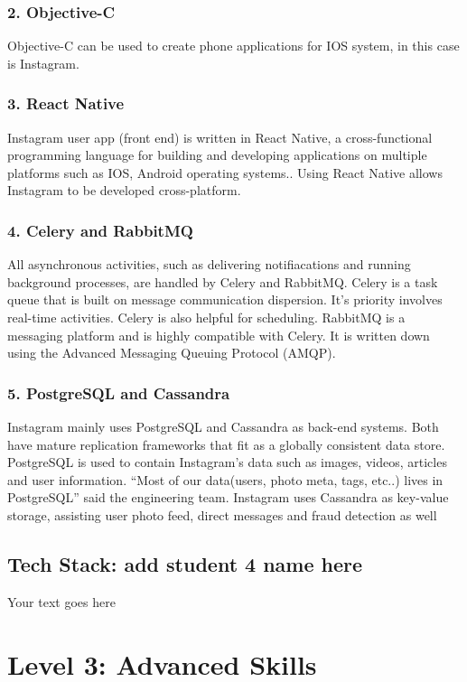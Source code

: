 \documentclass[a4paper, 11pt]{report}
\begin{document}
\subsubsection{2. Objective-C}
Objective-C can be used to create phone applications for IOS system, in this case is Instagram.
\subsubsection{3. React Native}
Instagram user app (front end) is written in React Native, a cross-functional programming language for building and developing applications on multiple platforms such as IOS, Android operating systems.\cite{ky7}. Using React Native allows Instagram to be developed cross-platform.
\subsubsection{4. Celery and RabbitMQ}
All asynchronous activities, such as delivering notifiacations and running background processes, are handled by Celery and RabbitMQ. Celery is a task queue that is built on message communication dispersion. It's priority involves real-time activities. Celery is also helpful for scheduling. RabbitMQ is a messaging platform and is highly compatible with Celery. It is written down using the Advanced Messaging Queuing Protocol (AMQP)\cite{ky4}.
\subsubsection{5. PostgreSQL and Cassandra}
Instagram mainly uses PostgreSQL and Cassandra as back-end systems. Both have mature replication frameworks that fit as a globally consistent data store\cite{ky5}. PostgreSQL is used to contain Instagram’s data such as images, videos, articles and user information\cite{ky4}. “Most of our data(users, photo meta, tags, etc..) lives in PostgreSQL” said the engineering team. Instagram uses Cassandra as key-value storage, assisting user photo feed, direct messages and fraud detection as well\cite{ky6}
\subsection{Tech Stack: add student 4 name here}

Your text goes here



\newpage
\section{Level 3: Advanced Skills}
\end{document}
